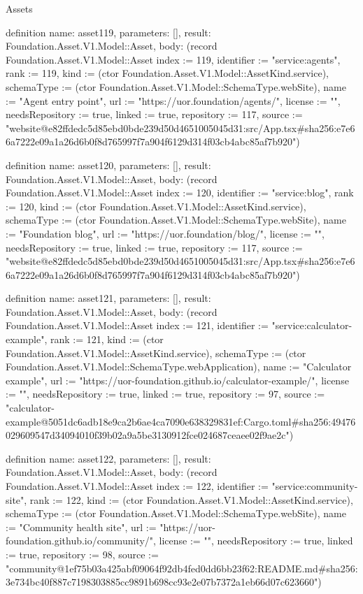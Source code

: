 \begin{lexlean}{Assets}
\begin{semanticmodule}
definition{
  name: asset119,
  parameters: [],
  result: Foundation.Asset.V1.Model::Asset,
  body: (record Foundation.Asset.V1.Model::Asset {index := 119, identifier := "service:agents", rank := 119, kind := (ctor Foundation.Asset.V1.Model::AssetKind.service), schemaType := (ctor Foundation.Asset.V1.Model::SchemaType.webSite), name := "Agent entry point", url := "https://uor.foundation/agents/", license := "", needsRepository := true, linked := true, repository := 117, source := "website@e82ffdedc5d85ebd0bde239d50d4651005045d31:src/App.tsx#sha256:e7e66a7222e09a1a26d6b0f8d765997f7a904f6129d314f03cb4abc85af7b920"})
}

definition{
  name: asset120,
  parameters: [],
  result: Foundation.Asset.V1.Model::Asset,
  body: (record Foundation.Asset.V1.Model::Asset {index := 120, identifier := "service:blog", rank := 120, kind := (ctor Foundation.Asset.V1.Model::AssetKind.service), schemaType := (ctor Foundation.Asset.V1.Model::SchemaType.webSite), name := "Foundation blog", url := "https://uor.foundation/blog/", license := "", needsRepository := true, linked := true, repository := 117, source := "website@e82ffdedc5d85ebd0bde239d50d4651005045d31:src/App.tsx#sha256:e7e66a7222e09a1a26d6b0f8d765997f7a904f6129d314f03cb4abc85af7b920"})
}

definition{
  name: asset121,
  parameters: [],
  result: Foundation.Asset.V1.Model::Asset,
  body: (record Foundation.Asset.V1.Model::Asset {index := 121, identifier := "service:calculator-example", rank := 121, kind := (ctor Foundation.Asset.V1.Model::AssetKind.service), schemaType := (ctor Foundation.Asset.V1.Model::SchemaType.webApplication), name := "Calculator example", url := "https://uor-foundation.github.io/calculator-example/", license := "", needsRepository := true, linked := true, repository := 97, source := "calculator-example@5051dc6adb18e9ca2b6ae4ca7090e638329831ef:Cargo.toml#sha256:49476029609547d34094010f39b02a9a5be3130912fce024687ceaee02f9ae2c"})
}

definition{
  name: asset122,
  parameters: [],
  result: Foundation.Asset.V1.Model::Asset,
  body: (record Foundation.Asset.V1.Model::Asset {index := 122, identifier := "service:community-site", rank := 122, kind := (ctor Foundation.Asset.V1.Model::AssetKind.service), schemaType := (ctor Foundation.Asset.V1.Model::SchemaType.webSite), name := "Community health site", url := "https://uor-foundation.github.io/community/", license := "", needsRepository := true, linked := true, repository := 98, source := "community@1ef75b03a425abf09064f92db4fed0dd6bb23f62:README.md#sha256:3e734bc40f887c7198303885cc9891b698cc93e2e07b7372a1eb66d07c623660"})
}


\end{semanticmodule}
\end{lexlean}
